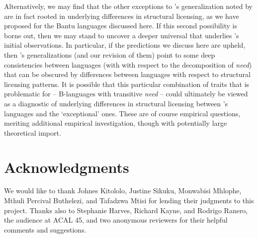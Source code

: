 \documentclass[output=paper,
modfonts
]{langscibook}
\begin{document}
Alternatively, we may find that the other exceptions to \citet{Harves:2012}'s  generalization
noted by \citet{Antonov:2014} are in fact rooted in underlying
differences in structural licensing, as we have proposed for the Bantu languages discussed here. 
If this second possibility is borne out, then we may stand to uncover a deeper universal that underlies \citet{Harves:2012}'s initial observations.  
In particular, if the predictions we discuss
here are upheld, then \citet{Harves:2012}'s generalizations (and our revision of
them) point to some deep consistencies between
languages (with  with respect to the decomposition of {\it need}) that can be obscured by  differences between languages with respect to structural
licensing patterns. It is possible that this
particular combination of traits that is problematic for \citet{Harves:2012} -- B-languages with transitive {\it need} -- could
ultimately be viewed as a diagnostic of underlying differences in structural
licensing between \citet{Harves:2012}'s languages and the `exceptional' ones. These are
of course empirical questions, meriting additional empirical
investigation, though with potentially large theoretical import.
 
 
\section*{Acknowledgments}
 
 We would like to thank Johnes Kitololo,
    Justine Sikuku, Monwabisi Mhlophe, Mthuli Percival Buthelezi, and
    Tafadzwa Mtisi for lending their judgments to this project. Thanks
    also to Stephanie Harves,  Richard Kayne, and Rodrigo Ranero, the
    audience at ACAL 45, and two anonymous reviewers for their helpful comments and suggestions. %


{\sloppy
\printbibliography[heading=subbibliography,notkeyword=this]
}
\end{document}
